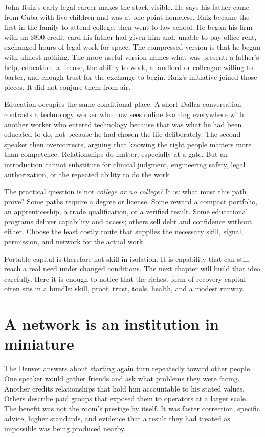 John Ruiz's early legal career makes the stack visible. He says his father came
from Cuba with five children and was at one point homeless. Ruiz became the
first in the family to attend college, then went to law school. He began his
firm with an \$800 credit card his father had given him and, unable to pay office
rent, exchanged hours of legal work for space. The compressed version is that
he began with almost nothing. The more useful version names what was present:
a father's help, education, a license, the ability to work, a landlord or
colleague willing to barter, and enough trust for the exchange to begin. Ruiz's
initiative joined those pieces. It did not conjure them from air.

Education occupies the same conditional place. A short Dallas conversation
contrasts a technology worker who now sees online learning everywhere with
another worker who entered technology because that was what he had been
educated to do, not because he had chosen the life deliberately. The second
speaker then overcorrects, arguing that knowing the right people matters more
than competence. Relationships do matter, especially at a gate. But an
introduction cannot substitute for clinical judgment, engineering safety,
legal authorization, or the repeated ability to do the work.

The practical question is not \emph{college or no college?} It is: what must
this path prove? Some paths require a degree or license. Some reward a compact
portfolio, an apprenticeship, a trade qualification, or a verified result.
Some educational programs deliver capability and access; others sell debt and
confidence without either. Choose the least costly route that supplies the
necessary skill, signal, permission, and network for the actual work.

Portable capital is therefore not skill in isolation. It is capability that
can still reach a real need under changed conditions. The next chapter will
build that idea carefully. Here it is enough to notice that the richest form
of recovery capital often sits in a bundle: skill, proof, trust, tools, health,
and a modest runway.

\section{A network is an institution in miniature}

The Denver answers about starting again turn repeatedly toward other people.
One speaker would gather friends and ask what problems they were facing.
Another credits relationships that hold him accountable to his stated values.
Others describe paid groups that exposed them to operators at a larger scale.
The benefit was not the room's prestige by itself. It was faster correction,
specific advice, higher standards, and evidence that a result they had treated
as impossible was being produced nearby.


